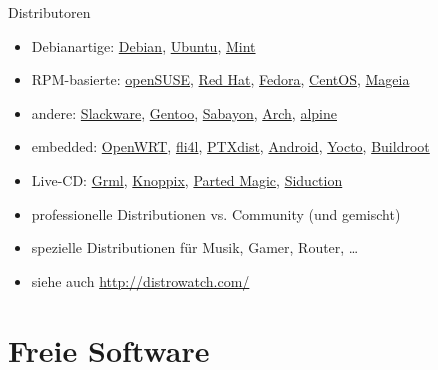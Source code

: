\documentclass{beamer}
\begin{document}
\begin{frame}{Distributoren}
    \begin{itemize}
        \item Debianartige:
            \href{https://www.debian.org/}{Debian},
            \href{https://www.ubuntu.com/}{Ubuntu},
            \href{https://linuxmint.com/}{Mint}
        \pause
        \item RPM-basierte:
            \href{https://www.opensuse.org/}{openSUSE},
            \href{https://www.redhat.com/}{Red Hat},
            \href{https://getfedora.org/}{Fedora},
            \href{https://www.centos.org/}{CentOS},
            \href{https://www.mageia.org/de/}{Mageia}
        \pause
        \item andere:
            \href{http://www.slackware.com/}{Slackware},
            \href{https://www.gentoo.org/}{Gentoo},
            \href{https://www.sabayon.org/}{Sabayon},
            \href{https://www.archlinux.org/}{Arch},
            \href{https://www.alpinelinux.org/}{alpine}
        \pause
        \item embedded:
            \href{https://openwrt.org/}{OpenWRT},
            \href{http://www.fli4l.de/}{fli4l},
            \href{https://www.ptxdist.org/}{PTXdist},
            \href{https://www.android.com/}{Android},
            \href{https://www.yoctoproject.org/}{Yocto},
            \href{https://buildroot.org/}{Buildroot}
        \pause
        \item Live-CD:
            \href{https://grml.org/}{Grml},
            \href{http://www.knopper.net/knoppix/}{Knoppix},
            \href{https://partedmagic.com/}{Parted Magic},
            \href{http://siduction.org/}{Siduction}
        \pause
        \item professionelle Distributionen vs. Community (und gemischt)
        \item spezielle Distributionen für Musik, Gamer, Router, …
        \item siehe auch \url{http://distrowatch.com/}
    \end{itemize}
\end{frame}

\section{Freie Software}

\frame{\tableofcontents[currentsection]}
\end{document}
